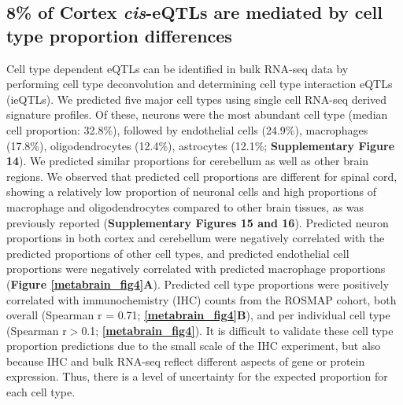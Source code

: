 \subsection{8\% of Cortex \textit{cis}-eQTLs are mediated by cell type proportion differences  }
Cell type dependent eQTLs can be identified in bulk RNA-seq data by performing cell type deconvolution and determining cell type interaction eQTLs (ieQTLs)\cite{donovanCellularDeconvolutionGTEx2020,glastonburyCellTypeHeterogeneityAdipose2019,raulaguirregamboaDeconvolutionBulkBlood2020}. We predicted five major cell types using single cell RNA-seq derived signature profiles\cite{zhengyuCellMapCharacterizingType}. Of these, neurons were the most abundant cell type (median cell proportion: 32.8\%), followed by endothelial cells (24.9\%), macrophages (17.8\%), oligodendrocytes (12.4\%), astrocytes (12.1\%; \textbf{Supplementary Figure 14}). We predicted similar proportions for cerebellum as well as other brain regions. We observed that predicted cell proportions are different for spinal cord, showing a relatively low proportion of neuronal cells and high proportions of macrophage and oligodendrocytes compared to other brain tissues, as was previously reported\cite{bahneyCellularCompositionGliaNeuron2018} (\textbf{Supplementary Figures 15 and 16}). Predicted neuron proportions in both cortex and cerebellum were negatively correlated with the predicted proportions of other cell types, and predicted endothelial cell proportions were negatively correlated with predicted macrophage proportions (\textbf{Figure \ref{metabrain_fig4}A}). Predicted cell type proportions were positively correlated with immunochemistry (IHC) counts from the ROSMAP cohort\cite{patrickDeconvolvingContributionsCelltype2020}, both overall (Spearman r = 0.71; \textbf{\ref{metabrain_fig4}B}), and per individual cell type (Spearman r$>$0.1; \textbf{\ref{metabrain_fig4}}).  It is difficult to validate these cell type proportion predictions due to the small scale of the IHC experiment, but also because IHC and bulk RNA-seq reflect different aspects of gene or protein expression. Thus, there is a level of uncertainty for the expected proportion for each cell type\cite{herculano-houzelHumanBrainNumbers2009,vonbartheldSearchTrueNumbers2016}. 

